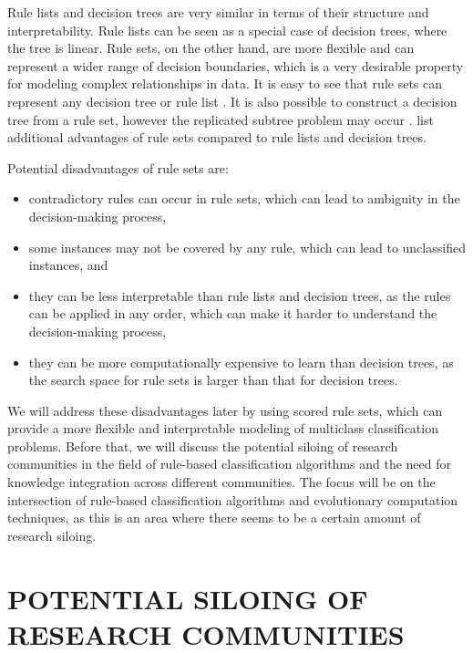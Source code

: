 \documentclass[a4paper,twoside]{article}
\begin{document}
Rule lists and decision trees are very similar in terms of their structure and interpretability. Rule lists can be seen as a special case of decision trees, where the tree is linear. Rule sets, on the other hand, are more flexible and can represent a wider range of decision boundaries, which is a very desirable property for modeling complex relationships in data. It is easy to see that rule sets can represent any decision tree or rule list \citep[see e.g.][]{witten2025data}. It is also possible to construct a decision tree from a rule set, however the replicated subtree problem may occur \citep{witten2025data}. \citet{fuernkranz2012foundations} list additional advantages of rule sets compared to rule lists and decision trees.

Potential disadvantages of rule sets are:

\begin{itemize}
  \item contradictory rules can occur in rule sets, which can lead to ambiguity in the decision-making process, 
  \item some instances may not be covered by any rule, which can lead to unclassified instances, and
  \item they can be less interpretable than rule lists and decision trees, as the rules can be applied in any order, which can make it harder to understand the decision-making process,
  \item they can be more computationally expensive to learn than decision trees, as the search space for rule sets is larger than that for decision trees.  
\end{itemize}

We will address these disadvantages later by using scored rule sets, which can provide a more flexible and interpretable modeling of multiclass classification problems. Before that, we will discuss the potential siloing of research communities in the field of rule-based classification algorithms and the need for knowledge integration across different communities. The focus will be on the intersection of rule-based classification algorithms and evolutionary computation techniques, as this is an area where there seems to be a certain amount of research siloing.

\section{\uppercase{Potential Siloing of Research Communities}}
\end{document}
